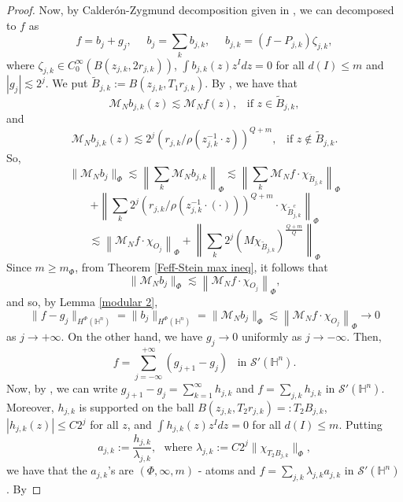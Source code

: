 \documentclass[oneside,10pt]{article}
\begin{document}
\begin{proof}
Now, by Calder\'on-Zygmund decomposition given in \cite[Chapter 3]{Foll-St}, we can decomposed to $f$ as
\[
f = b_j  + g_j, \,\,\,\,\,\,\,\, b_j = \sum_k b_{j,k}, \,\,\,\,\,\,\,\, b_{j,k} = (f - P_{j,k}) \zeta_{j,k},
\]
where $\zeta_{j,k} \in C^{\infty}_{0}(B(z_{j,k}, 2 r_{j,k}))$, $\int b_{j,k}(z) z^{I} dz = 0$ for all $d(I) \leq m$ and $|g_j| \lesssim 2^j$. We put $\widetilde{B}_{j,k} := B(z_{j,k}, T_1 r_{j,k})$. By \cite[Lemmas 3.12 and 3.13]{Foll-St}, we have that
\[
\mathcal{M}_N b_{j,k}(z) \lesssim \mathcal{M}_N f(z), \,\,\,\,\, \text{if} \,\, z \in \widetilde{B}_{j,k},
\]
and 
\[
\mathcal{M}_N b_{j,k}(z) \lesssim 2^{j} \left( r_{j,k}/\rho(z_{j,k}^{-1} \cdot z) \right)^{Q+m}, \,\,\,\,\, \text{if} \,\, z \notin 
\widetilde{B}_{j,k}.
\]
So,
\[
\| \mathcal{M}_N b_j \|_{\Phi} \lesssim \left\| \sum_k \mathcal{M}_N b_{j, k} \right\|_{\Phi} \lesssim 
\left\| \sum_k \mathcal{M}_N f \cdot \chi_{\widetilde{B}_{j,k}} \right\|_{\Phi}
\]
\[ 
+ \left\| \sum_k 2^{j} \left( r_{j,k}/\rho(z_{j,k}^{-1} \cdot (\cdot)) \right)^{Q+m} \cdot \chi_{\widetilde{B}_{j,k}^{c}} \right\|_{\Phi}
\]
\[
\lesssim \left\| \mathcal{M}_N f \cdot \chi_{O_j} \right\|_{\Phi} +
\left\| \sum_k 2^{j} \left( M\chi_{\widetilde{B}_{j,k}} \right)^{\frac{Q+m}{Q}} \right\|_{\Phi}
\]
Since $m \geq m_{\Phi}$, from Theorem \ref{Feff-Stein max ineq}, it follows that
\[
\| \mathcal{M}_N b_j \|_{\Phi} \lesssim \left\| \mathcal{M}_N f \cdot \chi_{O_j} \right\|_{\Phi},
\]
and so, by Lemma \ref{modular 2},
\[
\| f - g_j \|_{H^{\Phi}(\mathbb{H}^n)} = \| b_j \|_{H^{\Phi}(\mathbb{H}^n)} = \| \mathcal{M}_N b_j \|_{\Phi} \lesssim  
\left\| \mathcal{M}_N f \cdot \chi_{O_j} \right\|_{\Phi} \to 0
\]
as $j \to +\infty$. On the other hand, we have $g_j \to 0$ uniformly as $j \to -\infty$. Then,
\[
f = \sum_{j=-\infty}^{+\infty} (g_{j+1} - g_j) \,\,\,\,\, \text{in} \,\, \mathcal{S}'(\mathbb{H}^n).
\]
Now, by \cite[p. 101-102]{Foll-St}, we can write $g_{j+1} - g_j = \sum_{k=1}^{\infty} h_{j,k}$ and $f = \sum_{j,k} h_{j,k}$ in 
$\mathcal{S}'(\mathbb{H}^n)$. Moreover, $h_{j,k}$ is supported on the ball $B(z_{j,k}, T_2 r_{j,k}) =: T_2 B_{j,k}$, $| h_{j,k} (z)| \leq C 2^{j}$ for 
all $z$, and $\int h_{j,k}(z) z^{I} dz = 0$ for all $d(I) \leq m$. Putting
\begin{equation} \label{ajk and lambdajk}
a_{j,k} := \frac{h_{j,k}}{\lambda_{j,k}}, \,\,\,\, \text{where} \,\, \lambda_{j,k} := C 2^{j} \| \chi_{T_2 B_{j,k}} \|_{\Phi},
\end{equation}
we have that the $a_{j,k}$'s are $(\Phi, \infty, m)$ - atoms and $f = \sum_{j,k} \lambda_{j,k} a_{j,k}$ in $\mathcal{S}'(\mathbb{H}^n)$. By 

\end{proof}
\end{document}
